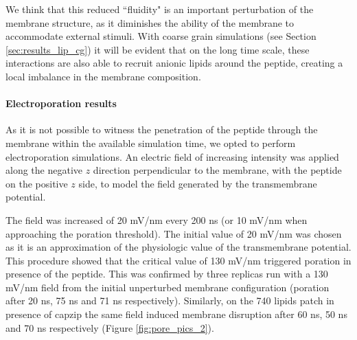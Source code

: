 We think that this reduced ``fluidity" is an important perturbation of the membrane structure, as it diminishes the ability of the membrane to accommodate external stimuli. With coarse grain simulations (see Section \ref{sec:results_lip_cg}) it will be evident that on the long time scale, these interactions are also able to recruit anionic lipids around the peptide, creating a local imbalance in the membrane composition.


\paragraph{Electroporation results}
As it is not possible to witness the penetration of the peptide through the membrane within the available simulation time, we opted to perform electroporation simulations.
%
An electric field of increasing intensity was applied along the negative $z$ direction perpendicular to the membrane, with the peptide on the positive $z$ side, to model the field generated by the transmembrane potential.

The field was increased of 20 mV/nm every 200 ns (or 10 mV/nm when approaching the poration threshold). The initial value of 20 mV/nm was chosen as it is an approximation of the physiologic value of the transmembrane potential. This procedure showed that the critical value of 130 mV/nm triggered poration in presence of the peptide. 
%
This was confirmed by three replicas run with a 130 mV/nm field from the initial unperturbed membrane configuration (poration after 20 ns, 75 ns and 71 ns respectively).
%
Similarly, on the 740 lipids patch in presence of capzip the same field induced membrane disruption after 60 ns, 50 ns and 70 ns respectively (Figure \ref{fig:pore_pics_2}).

